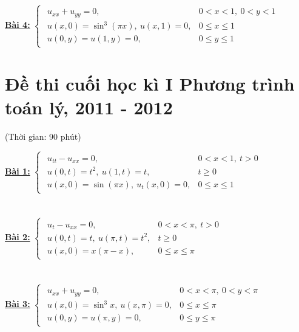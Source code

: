 \documentclass[10.5pt, a4paper]{article}
\begin{document}
\color{red}\underline{\textbf{Bài 4:}} \color{black}$\begin{cases}
\begin{array}{ll}
u_{xx}+u_{yy}=0, & 0<x<1,~0<y<1\\
u(x,0)=\sin^3(\pi x),~u(x,1)=0, & 0\le x\le1\\
u(0,y)=u(1,y)=0, & 0\le y\le1
\end{array}
\end{cases}$

\newpage

\section{Đề thi cuối học kì I Phương trình toán lý, 2011 - 2012}
\begin{center}
	\color{blue}(Thời gian: 90 phút)
\end{center}
\color{red}\underline{\textbf{Bài 1:}} \color{black}$\begin{cases}
\begin{array}{ll}
u_{tt}-u_{xx}=0, & 0<x<1,~t>0\\
u(0,t)=t^2,~u(1,t)=t, & t\ge0\\
u(x,0)=\sin(\pi x),~u_t(x,0)=0, & 0\le x\le1
\end{array}
\end{cases}$\\\\\\
\color{red}\underline{\textbf{Bài 2:}} \color{black}$\begin{cases}
\begin{array}{ll}
u_t-u_{xx}=0, & 0<x<\pi,~t>0\\
u(0,t)=t,~u(\pi,t)=t^2, & t\ge0\\
u(x,0)=x(\pi-x), & 0\le x\le\pi
\end{array}
\end{cases}$\\\\\\
\color{red}\underline{\textbf{Bài 3:}} \color{black}$\begin{cases}
\begin{array}{ll}
u_{xx}+u_{yy}=0, & 0<x<\pi,~0<y<\pi\\
u(x,0)=\sin^3x,~u(x,\pi)=0, & 0\le x\le\pi\\
u(0,y)=u(\pi,y)=0, & 0\le y\le\pi
\end{array}
\end{cases}$
\newpage
\end{document}
